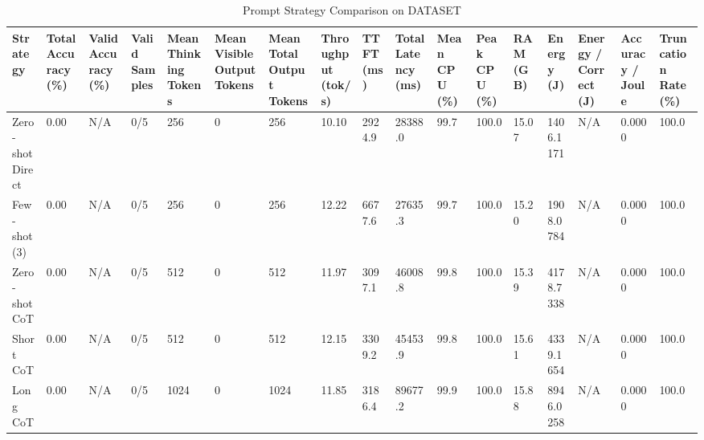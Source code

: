 \begin{table}
\caption{Prompt Strategy Comparison on DATASET}
\label{tab:strategy_comparison}
\begin{tabular}{lllllllllllllllll}
\toprule
Strategy & Total Accuracy (\%) & Valid Accuracy (\%) & Valid Samples & Mean Thinking Tokens & Mean Visible Output Tokens & Mean Total Output Tokens & Throughput (tok/s) & TTFT (ms) & Total Latency (ms) & Mean CPU (\%) & Peak CPU (\%) & RAM (GB) & Energy (J) & Energy / Correct (J) & Accuracy / Joule & Truncation Rate (\%) \\
\midrule
Zero-shot Direct & 0.00 & N/A & 0/5 & 256 & 0 & 256 & 10.10 & 2924.9 & 28388.0 & 99.7 & 100.0 & 15.07 & 1406.1171 & N/A & 0.0000 & 100.0 \\
Few-shot (3) & 0.00 & N/A & 0/5 & 256 & 0 & 256 & 12.22 & 6677.6 & 27635.3 & 99.7 & 100.0 & 15.20 & 1908.0784 & N/A & 0.0000 & 100.0 \\
Zero-shot CoT & 0.00 & N/A & 0/5 & 512 & 0 & 512 & 11.97 & 3097.1 & 46008.8 & 99.8 & 100.0 & 15.39 & 4178.7338 & N/A & 0.0000 & 100.0 \\
Short CoT & 0.00 & N/A & 0/5 & 512 & 0 & 512 & 12.15 & 3309.2 & 45453.9 & 99.8 & 100.0 & 15.61 & 4339.1654 & N/A & 0.0000 & 100.0 \\
Long CoT & 0.00 & N/A & 0/5 & 1024 & 0 & 1024 & 11.85 & 3186.4 & 89677.2 & 99.9 & 100.0 & 15.88 & 8946.0258 & N/A & 0.0000 & 100.0 \\
\bottomrule
\end{tabular}
\end{table}
